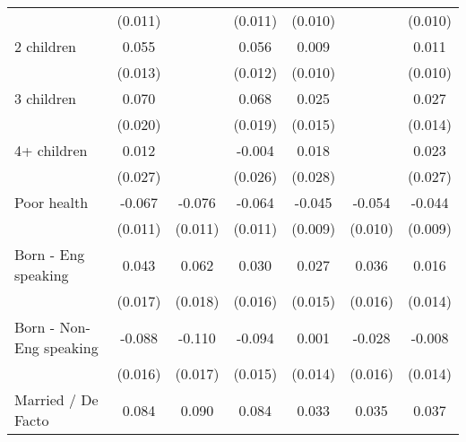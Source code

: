 {\begin{tabular}{l*{6}{c}}
                    &     (0.011)         &                     &     (0.011)         &     (0.010)         &                     &     (0.010)         \\
2 children          &       0.055\sym{***}&                     &       0.056\sym{***}&       0.009         &                     &       0.011         \\
                    &     (0.013)         &                     &     (0.012)         &     (0.010)         &                     &     (0.010)         \\
3 children          &       0.070\sym{***}&                     &       0.068\sym{***}&       0.025\sym{*}  &                     &       0.027\sym{*}  \\
                    &     (0.020)         &                     &     (0.019)         &     (0.015)         &                     &     (0.014)         \\
4+ children         &       0.012         &                     &      -0.004         &       0.018         &                     &       0.023         \\
                    &     (0.027)         &                     &     (0.026)         &     (0.028)         &                     &     (0.027)         \\
Poor health         &      -0.067\sym{***}&      -0.076\sym{***}&      -0.064\sym{***}&      -0.045\sym{***}&      -0.054\sym{***}&      -0.044\sym{***}\\
                    &     (0.011)         &     (0.011)         &     (0.011)         &     (0.009)         &     (0.010)         &     (0.009)         \\
Born - Eng speaking &       0.043\sym{**} &       0.062\sym{***}&       0.030\sym{*}  &       0.027\sym{*}  &       0.036\sym{**} &       0.016         \\
                    &     (0.017)         &     (0.018)         &     (0.016)         &     (0.015)         &     (0.016)         &     (0.014)         \\
Born - Non-Eng speaking&      -0.088\sym{***}&      -0.110\sym{***}&      -0.094\sym{***}&       0.001         &      -0.028\sym{*}  &      -0.008         \\
                    &     (0.016)         &     (0.017)         &     (0.015)         &     (0.014)         &     (0.016)         &     (0.014)         \\
Married / De Facto  &       0.084\sym{***}&       0.090\sym{***}&       0.084\sym{***}&       0.033\sym{***}&       0.035\sym{***}&       0.037\sym{***}\\

\end{tabular}}

